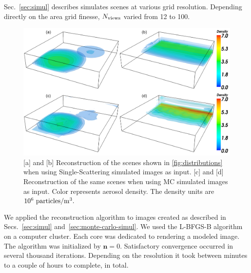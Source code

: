\documentclass[10pt,letterpaper]{article}
\newcommand{\yoavcomment}[1]{}
\renewcommand{\yoavcomment}[1]{#1} %
\begin{document}
Sec.~\ref{sec:simul} describes simulates scenes at various grid
resolution.  Depending directly on the area grid finesse, $N_{\rm
  views}$ varied from 12 to 100.
\begin{figure}
  \centering
  \yoavcomment{\includegraphics[width=\columnwidth]{images/results}}
  \caption{\small [a] and [b] Reconstruction of the scenes shown in
    \cref{fig:distributions} when using Single-Scattering simulated
    images as input.  [c] and [d] Reconstruction of the same scenes
    when using MC simulated images as input.  Color represents aerosol
    density. The density units are $10^{6}~{\rm particles}/{\rm
      m}^3.$}
  \label{fig:results}
\end{figure}
We applied the reconstruction algorithm to images created as described
in Secs.~\ref{sec:simul} and~\ref{sec:monte-carlo-simul}. We used the
L-BFGS-B algorithm~\cite{BFGS} on a computer cluster. Each core was
dedicated to rendering a modeled image. The algorithm was initialized
by ${\bm n}=0$.  Satisfactory convergence occurred in several thousand
iterations. Depending on the resolution it took between minutes to a
couple of hours to complete, in total.
\end{document}
